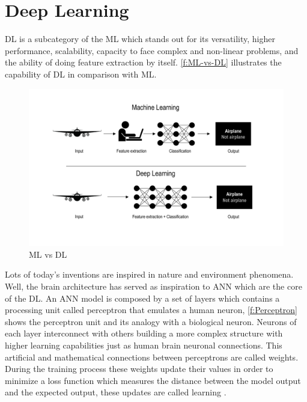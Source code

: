 \section{Deep Learning}
\label{s:Second-Background-Deep-Learning}

\ac{DL} is a subcategory of the \ac{ML} which stands out for its versatility, higher performance, scalability, capacity to face complex and non-linear problems, and the ability of doing feature extraction by itself. \autoref{f:ML-vs-DL} illustrates the capability of \ac{DL} in comparison with \ac{ML}. 

\begin{figure}[h]
\centering
\includegraphics[width=\linewidth]{figures/Ch2/MLvsDL.png}
\caption{ML vs DL}
\label{f:ML-vs-DL}
\end{figure}

Lots of today's inventions are inspired in nature and environment phenomena. Well, the brain architecture has served as inspiration to \ac{ANN} which are the core of the \ac{DL}. An \ac{ANN} model is composed by a set of layers which contains a processing unit called perceptron that emulates a human neuron, \autoref{f:Perceptron} shows the perceptron unit and its analogy with a biological neuron. Neurons of each layer interconnect with others building a more complex structure with higher learning capabilities just as human brain neuronal connections. This artificial and mathematical connections between perceptrons are called weights. During the training process these weights update their values in order to minimize a loss function which measures the distance between the model output and the expected output, these updates are called learning \cite{Chollet2018}. 

